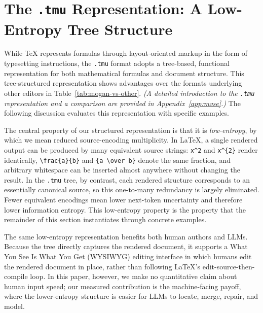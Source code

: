 \section{The \texttt{.tmu} Representation: A Low-Entropy Tree Structure}
\label{sec:mogan}

While {\TeX} represents formulas through layout-oriented markup in the form of typesetting instructions, the \texttt{.tmu} format adopts a tree-based, functional representation for both mathematical formulas and document structure. This tree-structured representation shows advantages over the formats underlying other editors in Table~\ref{tab:mogan-vs-other}. \emph{(A detailed introduction to the \texttt{.tmu} representation and a comparison are provided in Appendix~\ref{app:mvse}.)} The following discussion evaluates this representation with specific examples.

The central property of our structured representation is that it is \emph{low-entropy}, by which we mean reduced source-encoding multiplicity. In \LaTeX{}, a single rendered output can be produced by many equivalent source strings: \verb|x^2| and \verb|x^{2}| render identically, \verb|\frac{a}{b}| and \verb|{a \over b}| denote the same fraction, and arbitrary whitespace can be inserted almost anywhere without changing the result. In the \texttt{.tmu} tree, by contrast, each rendered structure corresponds to an essentially canonical source, so this one-to-many redundancy is largely eliminated. Fewer equivalent encodings mean lower next-token uncertainty and therefore lower information entropy. This low-entropy property is the property that the remainder of this section instantiates through concrete examples.

The same low-entropy representation benefits both human authors and LLMs. Because the tree directly captures the rendered document, it supports a What You See Is What You Get (WYSIWYG) editing interface in which humans edit the rendered document in place, rather than following \LaTeX{}'s edit-source-then-compile loop. In this paper, however, we make no quantitative claim about human input speed; our measured contribution is the machine-facing payoff, where the lower-entropy structure is easier for LLMs to locate, merge, repair, and model.

